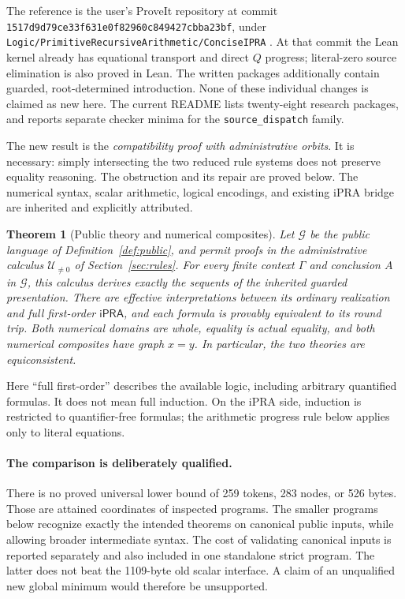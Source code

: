 \documentclass[11pt,letterpaper]{article}
\newtheorem{theorem}{Theorem}[section]
\theoremstyle{definition}\newtheorem{definition}[theorem]{Definition}
\theoremstyle{remark}\newtheorem{remark}[theorem]{Remark}
\newcommand{\ipra}{\mathsf{iPRA}}
\newcommand{\CG}{\mathcal G}
\newcommand{\UR}{\mathcal U_{\ne0}}
\newcommand{\file}[1]{{\small\nolinkurl{#1}}}
\begin{document}
The reference is the user's ProveIt repository at commit
\nolinkurl{1517d9d79ce33f631e0f82960c849427cbba23bf}, under
\file{Logic/PrimitiveRecursiveArithmetic/ConciseIPRA} \cite{repo}.
At that commit the Lean kernel already has equational transport and direct
$Q$ progress; literal-zero source elimination is also proved in Lean.
The written packages additionally contain guarded, root-determined
introduction. None of these individual changes is claimed as new here.
The current README lists twenty-eight research packages, and reports
separate checker minima for the \file{source_dispatch} family.

The new result is the \emph{compatibility proof with administrative orbits}.
It is necessary: simply intersecting the two reduced rule systems does not
preserve equality reasoning. The obstruction and its repair are proved
below. The numerical syntax, scalar arithmetic, logical encodings, and
existing iPRA bridge are inherited and explicitly attributed.

\begin{theorem}[Public theory and numerical composites]\label{thm:main}
Let $\CG$ be the public language of Definition~\ref{def:public}, and permit
proofs in the administrative calculus $\UR$ of
Section~\ref{sec:rules}. For every finite context $\Gamma$ and conclusion $A$
in $\CG$, this calculus derives exactly the sequents of the inherited
guarded presentation. There are effective interpretations between its
ordinary realization and full first-order $\ipra$, and each formula is
provably equivalent to its round trip. Both numerical domains are whole,
equality is actual equality, and both numerical composites have graph $x=y$.
In particular, the two theories are equiconsistent.
\end{theorem}

Here ``full first-order'' describes the available logic, including arbitrary
quantified formulas. It does not mean full induction. On the iPRA side,
induction is restricted to quantifier-free formulas; the arithmetic progress
rule below applies only to literal equations.

\paragraph{The comparison is deliberately qualified.}
There is no proved universal lower bound of 259 tokens, 283 nodes, or
526 bytes. Those are attained coordinates of inspected programs.
The smaller programs below recognize exactly the intended theorems on
canonical public inputs, while allowing broader intermediate syntax.
The cost of validating canonical inputs is reported separately and also
included in one standalone strict program. The latter does not beat the
1109-byte old scalar interface. A claim of an unqualified new global minimum
would therefore be unsupported.
\end{document}
